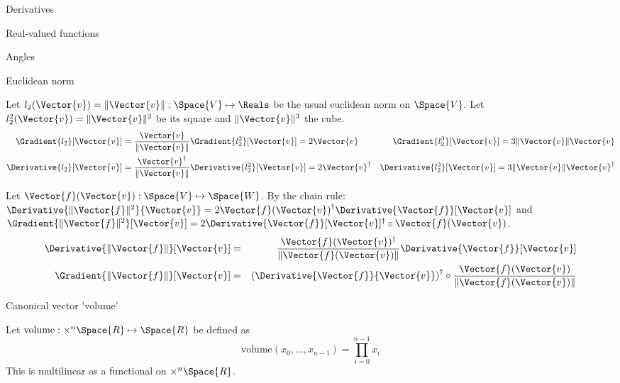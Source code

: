\begin{plSection}{Derivatives}
\begin{plSection}{Real-valued functions}
\begin{plSection}{Angles}
\end{plSection}%
\begin{plSection}{Euclidean norm}
\label{sec:derivatives-of-euclidean-norm}

Let 
$l_2(\Vector{v}) = \| \Vector{v} \|: \Space{V} \mapsto \Reals$
be the usual euclidean norm on $\Space{V}$.
Let $l_2^2(\Vector{v}) = \| \Vector{v}  \|^2 $
be its square and $ \| \Vector{v}  \|^3$ the cube.
\begin{eqnarray}
\label{eq:l2-gradient}
\Gradient{l_2}[\Vector{v}] = \frac{\Vector{v}}{\|\Vector{v}\|} 
&
\Gradient{l_2^2}[\Vector{v}] = 2\Vector{v}
&
\Gradient{l_2^3}[\Vector{v}] = 3 \|\Vector{v}\| \Vector{v} 
\\
\Derivative{l_2}[\Vector{v}] 
= \frac{ \Vector{v}^\dagger }{ \| \Vector{v}  \|} 
&
\Derivative{l_2^2}[\Vector{v}] = 2\Vector{v}^\dagger 
&
\Derivative{l_2^3}[\Vector{v}] 
= 3 \| \Vector{v}  \| \Vector{v}^\dagger 
\nonumber
\end{eqnarray}

Let $\Vector{f}(\Vector{v}) : \Space{V} \mapsto \Space{W}$.
By the chain rule:
$\Derivative{\| \Vector{f} \|^2}{\Vector{v}}  
=  2 {\Vector{f}(\Vector{v})}^{\dagger} 
\Derivative{\Vector{f}}[\Vector{v}] $
and
$\Gradient{\| \Vector{f} \|^2}[\Vector{v}]  
=  2 \Derivative{\Vector{f}}[\Vector{v}]^\dagger 
\circ \Vector{f}(\Vector{v})$.
\begin{eqnarray}
\label{eq:norm_derivative}
\Derivative{\| \Vector{f} \|}[\Vector{v}]
& = &
\frac{\Vector{f}(\Vector{v})^\dagger}
{\| \Vector{f}(\Vector{v}) \|} 
\Derivative{\Vector{f}}[\Vector{v}]  \\
\Gradient{\| \Vector{f} \|}[\Vector{v}]
& = &
\left(
\Derivative{\Vector{f}}{\Vector{v}}\right)^\dagger 
\circ 
\frac{\Vector{f}(\Vector{v})}{\| \Vector{f}(\Vector{v}) \|}
\label{eq:norm_gradient}
\end{eqnarray}

\end{plSection}%
\begin{plSection}{Canonical vector 'volume'}
\label{sec:Derivative-of-canonical-vector-volume}

Let $\text{volume} : \times^{n} \Space{R} \mapsto \Space{R}$ 
be defined as
\begin{equation}
\text{volume} \left( x_0 , \ldots , x_{n-1} \right) = \prod_{i=0}^{n-1} x_i
\end{equation}
This is multilinear as a functional on $\times^{n} \Space{R}$.


\end{plSection}
\end{plSection}
\end{plSection}
